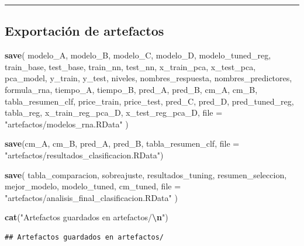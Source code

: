 \documentclass[
]{article}
\newenvironment{Shaded}{\begin{snugshade}}{\end{snugshade}}
\newcommand{\AttributeTok}[1]{\textcolor[rgb]{0.13,0.29,0.53}{#1}}
\newcommand{\FunctionTok}[1]{\textcolor[rgb]{0.13,0.29,0.53}{\textbf{#1}}}
\newcommand{\NormalTok}[1]{#1}
\newcommand{\SpecialCharTok}[1]{\textcolor[rgb]{0.81,0.36,0.00}{\textbf{#1}}}
\newcommand{\StringTok}[1]{\textcolor[rgb]{0.31,0.60,0.02}{#1}}
\begin{document}
\begin{center}\rule{0.5\linewidth}{0.5pt}\end{center}

\hypertarget{exportaciuxf3n-de-artefactos}{%
\subsection{Exportación de
artefactos}\label{exportaciuxf3n-de-artefactos}}

\begin{Shaded}
\begin{Highlighting}[]
\FunctionTok{save}\NormalTok{(}
\NormalTok{  modelo\_A, modelo\_B,}
\NormalTok{  modelo\_C, modelo\_D, modelo\_tuned\_reg,}
\NormalTok{  train\_base, test\_base,}
\NormalTok{  train\_nn, test\_nn,}
\NormalTok{  x\_train\_pca, x\_test\_pca,}
\NormalTok{  pca\_model,}
\NormalTok{  y\_train, y\_test,}
\NormalTok{  niveles, nombres\_respuesta, nombres\_predictores, formula\_rna,}
\NormalTok{  tiempo\_A, tiempo\_B,}
\NormalTok{  pred\_A, pred\_B,}
\NormalTok{  cm\_A, cm\_B,}
\NormalTok{  tabla\_resumen\_clf,}
\NormalTok{  price\_train, price\_test,}
\NormalTok{  pred\_C, pred\_D, pred\_tuned\_reg,}
\NormalTok{  tabla\_reg,}
\NormalTok{  x\_train\_reg\_pca\_D, x\_test\_reg\_pca\_D,}
  \AttributeTok{file =} \StringTok{"artefactos/modelos\_rna.RData"}
\NormalTok{)}

\FunctionTok{save}\NormalTok{(cm\_A, cm\_B, pred\_A, pred\_B, tabla\_resumen\_clf,}
     \AttributeTok{file =} \StringTok{"artefactos/resultados\_clasificacion.RData"}\NormalTok{)}

\FunctionTok{save}\NormalTok{(}
\NormalTok{  tabla\_comparacion, sobreajuste, resultados\_tuning,}
\NormalTok{  resumen\_seleccion, mejor\_modelo,}
\NormalTok{  modelo\_tuned, cm\_tuned,}
  \AttributeTok{file =} \StringTok{"artefactos/analisis\_final\_clasificacion.RData"}
\NormalTok{)}

\FunctionTok{cat}\NormalTok{(}\StringTok{"Artefactos guardados en artefactos/}\SpecialCharTok{\textbackslash{}n}\StringTok{"}\NormalTok{)}
\end{Highlighting}
\end{Shaded}

\begin{verbatim}
## Artefactos guardados en artefactos/
\end{verbatim}
\end{document}
